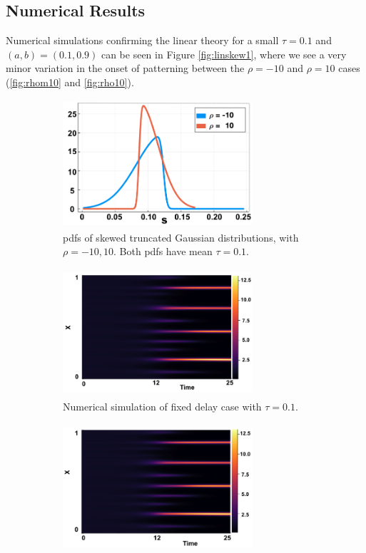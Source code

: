 \subsection{Numerical Results}\label{section:numresskew}

Numerical simulations confirming the linear theory for a small $\tau=0.1$ and $(a,b)=(0.1,0.9)$ can be seen in Figure \ref{fig:linskew1}, where we see a very minor variation in the onset of patterning between the $\rho=-10$ and $\rho=10$ cases (\ref{fig:rhom10} and \ref{fig:rho10}).

\begin{figure}[H]
    \centering
    \begin{subfigure}[t]{0.45\textwidth}
        \centering
        \includegraphics[width=7cm,height=4.75cm]{skewdist.png}
        \caption{pdfs of skewed truncated Gaussian distributions, with $\rho=-10,10$. Both pdfs have mean $\tau=0.1$.}
        \label{}
    \end{subfigure}
    \hfill
    \begin{subfigure}[t]{0.45\textwidth}
        \centering
        \includegraphics[width=7cm,height=4.75cm]{fixp1.png}
        \caption{Numerical simulation of fixed delay case with $\tau=0.1$.}
        \label{}
    \end{subfigure}
    \hfill
    \begin{subfigure}[t]{0.45\textwidth}
        \centering
        \includegraphics[width=7cm,height=4.75cm]{skewm10.png}

\end{subfigure}
\end{figure}
